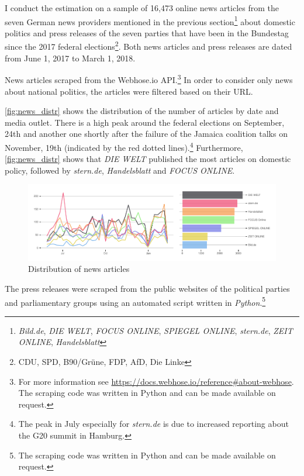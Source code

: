 \documentclass[
]{article}
\begin{document}
I conduct the estimation on a sample of 16,473 online news articles from
the seven German news providers mentioned in the previous
section\footnote{\emph{Bild.de}, \emph{DIE WELT}, \emph{FOCUS ONLINE},
  \emph{SPIEGEL ONLINE}, \emph{stern.de}, \emph{ZEIT ONLINE},
  \emph{Handelsblatt}} about domestic politics and press releases of the
seven parties that have been in the Bundestag since the 2017 federal
elections\footnote{CDU, SPD, B90/Grüne, FDP, AfD, Die Linke}. Both news
articles and press releases are dated from June 1, 2017 to March 1,
2018.

News articles scraped from the Webhose.io API.\footnote{For more
  information see
  \url{https://docs.webhose.io/reference\#about-webhose}. The scraping
  code was written in Python and can be made available on request.} In
order to consider only news about national politics, the articles were
filtered based on their URL.

\autoref{fig:news_distr} shows the distribution of the number of
articles by date and media outlet. There is a high peak around the
federal elections on September, 24th and another one shortly after the
failure of the Jamaica coalition talks on November, 19th (indicated by
the red dotted lines).\footnote{The peak in July especially for
  \emph{stern.de} is due to increased reporting about the G20 summit in
  Hamburg.} Furthermore, \autoref{fig:news_distr} shows that \emph{DIE
WELT} published the most articles on domestic policy, followed by
\emph{stern.de}, \emph{Handelsblatt} and \emph{FOCUS ONLINE}.

\begin{figure}

{\centering \includegraphics[width=0.8\linewidth]{main_text_files/figure-latex/Distribution of news articles-1} 

}

\caption{Distribution of news articles \label{fig:news_distr}}\label{fig:Distribution of news articles}
\end{figure}

The press releases were scraped from the public websites of the
political parties and parliamentary groups using an automated script
written in \emph{Python}.\footnote{The scraping code was written in
  Python and can be made available on request.}
\end{document}
